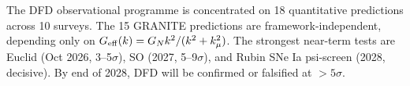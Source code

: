 \documentclass[11pt,a4paper]{article}
\newcommand{\kmu}{k_\mu}
\newcommand{\Geff}{G_{\rm eff}}
\begin{document}
The DFD observational programme is concentrated on 18 quantitative
predictions across 10 surveys. The 15 GRANITE predictions are
framework-independent, depending only on $\Geff(k) = G_N k^2/(k^2
+ \kmu^2)$. The strongest near-term tests are Euclid (Oct 2026,
3--5$\sigma$), SO (2027, 5--9$\sigma$), and Rubin SNe Ia psi-screen
(2028, decisive). By end of 2028, DFD will be confirmed or falsified
at $> 5\sigma$.
\end{document}
